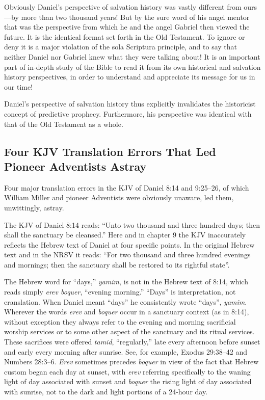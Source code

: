 Obviously Daniel's perspective of salvation history was vastly different
from ours---by more than two thousand years! But by the sure word of his
angel mentor that was the perspective from which he and the angel Gabriel
then viewed the future. It is the identical format set forth in the Old
Testament.\noteXXXV{}
To ignore or deny it is a major violation of the sola Scriptura
principle, and to say that neither Daniel nor Gabriel knew what they were
talking about! It is an important part of in-depth study of the Bible to 
read it from its own historical and salvation history perspectives, in order
to understand and appreciate its message for us in our time!

Daniel's perspective of salvation history thus explicitly invalidates the
historicist concept of predictive prophecy. Furthermore, his perspective was
identical with that of the Old Testament as a whole.

\subsection{Four KJV Translation Errors That Led Pioneer Adventists Astray}

Four major translation errors in the KJV of Daniel 8:14 and 9:25--26, of
which William Miller and pioneer Adventists were obviously unaware, led
them, unwittingly, astray.

The KJV of Daniel 8:14 reads: ``Unto two thousand and three hundred days;
then shall the sanctuary be cleansed.'' Here and in chapter 9 the KJV
inaccurately reflects the Hebrew text of Daniel at four specific points. In
the original Hebrew text and in the NRSV it reads: ``For two thousand and
three hundred evenings and mornings; then the sanctuary shall be restored
to its rightful state''.

The Hebrew word for ``days,'' \textit{yamim}, is not in the Hebrew text of 8:14, which
reads simply \textit{erev boquer}, ``evening morning.'' ``Days'' is interpretation, not
eranslation. When Daniel meant ``days'' he consistently wrote ``days'',
\textit{yamim}. Wherever the words \textit{erev} and \textit{boquer} occur in a sanctuary context
(as in 8:14), without exception they always refer to the evening and morning
sacrificial worship services or to some other aspect of the sanctuary and
its ritual services. These sacrifices were offered \textit{tamid}, ``regularly,'' late
every afternoon before sunset and early every morning after sunrise. See,
for example, Exodus 29:38--42 and Numbers 28:3--6. \textit{Erev} sometimes precedes
\textit{boquer} in view of the fact that Hebrew custom began each day at sunset, with
\textit{erev} referring specifically to the waning light of day associated with
sunset and \textit{boquer} the rising light of day associated with sunrise, not to
the dark and light portions of a 24-hour day.

